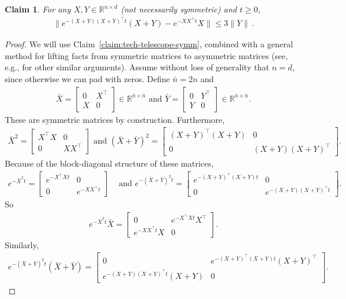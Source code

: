 \documentclass[11pt]{article} %
\newcommand{\R}{\mathbb{R}}
\newcommand{\<}{\langle}
\renewcommand{\>}{\rangle}
\newtheorem{claim}{Claim}
\theoremstyle{plain}
\theoremstyle{definition}
\theoremstyle{remark}
\begin{document}
\begin{claim}\label{claim:tech-telescope-asymm}
For any $X,Y \in \R^{n \times d}$ (not necessarily symmetric)  and $t \geq 0$,
\begin{align*}
\|e^{-(X+Y)(X+Y)^{\top} t}(X+Y) - e^{-X X^{\top} t} X\| \leq 3\|Y\|\,.
\end{align*}
\end{claim}
\begin{proof}
We will use Claim~\ref{claim:tech-telescope-symm}, combined with a general method for lifting facts from symmetric matrices to asymmetric matrices (see, e.g., \cite{tao2011topics} for other similar arguments).
Assume without loss of generality that $n = d$, since otherwise we can pad with zeros. Define $\bar{n} = 2n$ and
\begin{align*}\bar{X} = \begin{bmatrix} 0 & X^{\top} \\ X & 0
\end{bmatrix} \in \R^{\bar{n} \times \bar{n}} \mbox{ and } \bar{Y} = \begin{bmatrix} 0 & Y^{\top} \\ Y & 0 \end{bmatrix} \in \R^{\bar{n} \times \bar{n}}.\end{align*} These are symmetric matrices by construction. Furthermore,
\begin{align*}
\bar{X}^2 = \begin{bmatrix} X^{\top} X & 0 \\ 0 & X X^{\top}\end{bmatrix} \mbox{ and } (\bar{X} + \bar{Y})^2 = \begin{bmatrix} (X+Y)^{\top} (X+Y) & 0 \\ 0 & (X+Y) (X+Y)^{\top}\end{bmatrix}.
\end{align*}
Because of the block-diagonal structure of these matrices,
\begin{align*}
e^{-\bar{X}^2 t} = \begin{bmatrix} e^{-X^{\top}X t} & 0 \\ 0 & e^{-XX^{\top} t} \end{bmatrix} & \mbox{ and } e^{-(\bar{X}+\bar{Y})^2 t} = \begin{bmatrix} e^{-(X+Y)^{\top}(X+Y) t} & 0 \\ 0 & e^{-(X+Y)(X+Y)^{\top} t} \end{bmatrix}.
\end{align*}
So
\begin{align*}
e^{-\bar{X}^2 t} \bar{X} = \begin{bmatrix} 0 & e^{-X^{\top}X t} X^{\top} \\ e^{-XX^{\top} t} X & 0 \end{bmatrix}.
\end{align*}
Similarly,
\begin{align*}e^{-(\bar{X}+\bar{Y})^2 t} (\bar{X} + \bar{Y}) = \begin{bmatrix} 0 & e^{-(X+Y)^{\top}(X+Y) t} (X+Y)^{\top} \\ e^{-(X+Y)(X+Y)^{\top} t} (X+Y) &  0 \end{bmatrix}.
\end{align*}


\end{proof}
\end{document}
